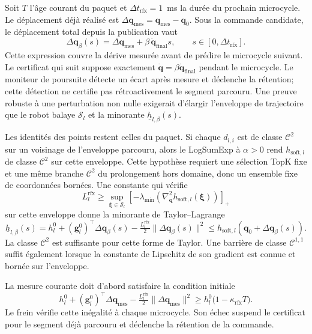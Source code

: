 Soit $T$ l'âge courant du paquet et $\Delta t_{\mathrm{rfx}}=1$~ms la durée du prochain microcycle. Le déplacement déjà réalisé est $\Delta\mathbf{q}_{\mathrm{mes}}=\mathbf{q}_{\mathrm{mes}}-\mathbf{q}_0$. Sous la commande candidate, le déplacement total depuis la publication vaut
\begin{equation}\label{eq:rfx_displacement}
\Delta\mathbf{q}_{\beta}(s)
=\Delta\mathbf{q}_{\mathrm{mes}}
+\beta\,\dot{\mathbf{q}}_{\mathrm{final}}s,
\qquad s\in[0,\Delta t_{\mathrm{rfx}}].
\end{equation}
Cette expression couvre la dérive mesurée avant de prédire le microcycle suivant. Le certificat qui suit suppose exactement $\dot{\mathbf{q}}=\beta\dot{\mathbf{q}}_{\mathrm{final}}$ pendant le microcycle. Le moniteur de poursuite détecte un écart après mesure et déclenche la rétention; cette détection ne certifie pas rétroactivement le segment parcouru. Une preuve robuste à une perturbation non nulle exigerait d'élargir l'enveloppe de trajectoire que le robot balaye $\mathcal{S}_l$ et la minorante $\underline{h}_{l,\beta}(s)$.

Les identités des points restent celles du paquet. Si chaque $d_{l,i}$ est de classe $\mathcal{C}^2$ sur un voisinage de l'enveloppe parcouru, alors le LogSumExp à $\alpha>0$ rend $h_{\mathrm{soft},l}$ de classe $\mathcal{C}^2$ sur cette enveloppe. Cette hypothèse requiert une sélection TopK fixe et une même branche $\mathcal{C}^2$ du prolongement hors domaine, donc un ensemble fixe de coordonnées bornées. Une constante qui vérifie
\begin{equation}\label{eq:rfx_curvature_condition}
L_l^{\mathrm{rfx}}\geq\sup_{\boldsymbol{\xi}\in\mathcal{S}_l}
\left[-\lambda_{\min}\!\left(\nabla_{\mathbf{q}}^2h_{\mathrm{soft},l}(\boldsymbol{\xi})\right)\right]_+
\end{equation}
sur cette enveloppe donne la minorante de Taylor--Lagrange
\begin{equation}
\underline h_{l,\beta}(s)
=h_l^0+(\mathbf{g}_l^0)^\top\Delta\mathbf{q}_{\beta}(s)
-\tfrac{L_l^{\mathrm{rfx}}}{2}\|\Delta\mathbf{q}_{\beta}(s)\|^2
\leq h_{\mathrm{soft},l}\!\left(\mathbf{q}_0+\Delta\mathbf{q}_{\beta}(s)\right).
\end{equation}
La classe $\mathcal{C}^2$ est suffisante pour cette forme de Taylor. Une barrière de classe $\mathcal{C}^{1,1}$ suffit également lorsque la constante de Lipschitz de son gradient est connue et bornée sur l'enveloppe.

La mesure courante doit d'abord satisfaire la condition initiale
\begin{equation}\label{eq:rfx_initial_condition}
h_l^0+(\mathbf{g}_l^0)^\top\Delta\mathbf{q}_{\mathrm{mes}}
-\tfrac{L_l^{\mathrm{rfx}}}{2}\|\Delta\mathbf{q}_{\mathrm{mes}}\|^2
\geq h_l^0\bigl(1-\kappa_{\mathrm{rfx}}T\bigr).
\end{equation}
Le frein vérifie cette inégalité à chaque microcycle. Son échec suspend le certificat pour le segment déjà parcouru et déclenche la rétention de la commande.

